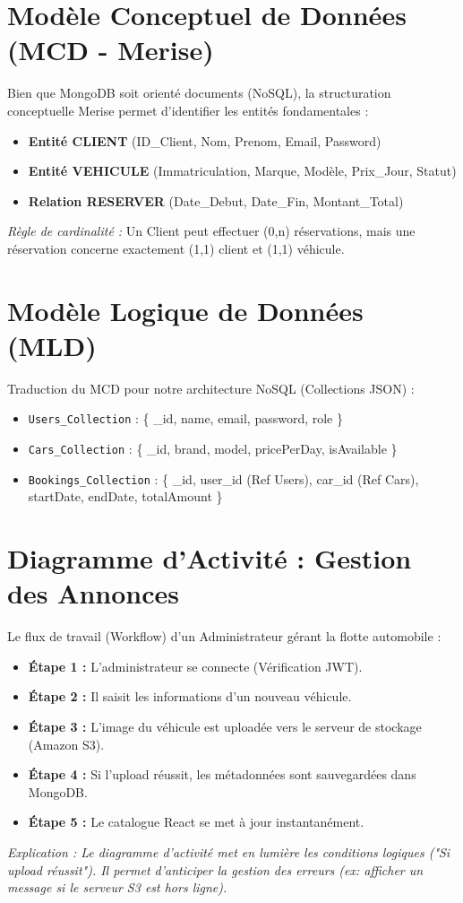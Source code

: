 \section{Modèle Conceptuel de Données (MCD - Merise)}
Bien que MongoDB soit orienté documents (NoSQL), la structuration conceptuelle Merise permet d'identifier les entités fondamentales :
\begin{itemize}
    \item \textbf{Entité CLIENT} (ID\_Client, Nom, Prenom, Email, Password)
    \item \textbf{Entité VEHICULE} (Immatriculation, Marque, Modèle, Prix\_Jour, Statut)
    \item \textbf{Relation RESERVER} (Date\_Debut, Date\_Fin, Montant\_Total)
\end{itemize}
\textit{Règle de cardinalité :} Un Client peut effectuer (0,n) réservations, mais une réservation concerne exactement (1,1) client et (1,1) véhicule.

\section{Modèle Logique de Données (MLD)}
Traduction du MCD pour notre architecture NoSQL (Collections JSON) :
\begin{itemize}
    \item \texttt{Users\_Collection} : \{ \_id, name, email, password, role \}
    \item \texttt{Cars\_Collection} : \{ \_id, brand, model, pricePerDay, isAvailable \}
    \item \texttt{Bookings\_Collection} : \{ \_id, user\_id (Ref Users), car\_id (Ref Cars), startDate, endDate, totalAmount \}
\end{itemize}

\section{Diagramme d'Activité : Gestion des Annonces}
Le flux de travail (Workflow) d'un Administrateur gérant la flotte automobile :
\begin{itemize}
    \item \textbf{Étape 1 :} L'administrateur se connecte (Vérification JWT).
    \item \textbf{Étape 2 :} Il saisit les informations d'un nouveau véhicule.
    \item \textbf{Étape 3 :} L'image du véhicule est uploadée vers le serveur de stockage (Amazon S3).
    \item \textbf{Étape 4 :} Si l'upload réussit, les métadonnées sont sauvegardées dans MongoDB.
    \item \textbf{Étape 5 :} Le catalogue React se met à jour instantanément.
\end{itemize}
\textit{Explication : Le diagramme d'activité met en lumière les conditions logiques ("Si upload réussit"). Il permet d'anticiper la gestion des erreurs (ex: afficher un message si le serveur S3 est hors ligne).}

